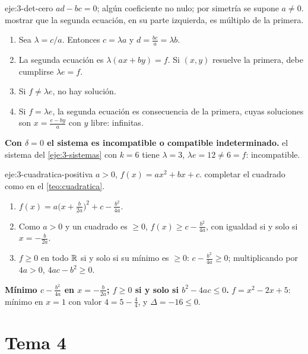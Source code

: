 \begin{solucion}{eje:3-det-cero}
\datos $ad-bc=0$; algún coeficiente no nulo; por simetría se supone $a\neq0$.
\planteamiento mostrar que la segunda ecuación, en su parte izquierda, es múltiplo de la primera.
\pasos
\begin{enumerate}[label=\arabic*.]
  \item Sea $\lambda=c/a$. Entonces $c=\lambda a$ y $d=\frac{bc}a=\lambda b$.
  \item La segunda ecuación es $\lambda(ax+by)=f$. Si $(x,y)$ resuelve la primera, debe cumplirse $\lambda e=f$.
  \item Si $f\neq\lambda e$, no hay solución.
  \item Si $f=\lambda e$, la segunda ecuación es consecuencia de la primera, cuyas soluciones son $x=\frac{e-by}a$ con $y$ libre: infinitas.
\end{enumerate}
\resultado \textbf{Con $\delta=0$ el sistema es incompatible o compatible indeterminado.}
\comprobacion el sistema del \cref{eje:3-sistemas} con $k=6$ tiene $\lambda=3$, $\lambda e=12\neq6=f$: incompatible.
\end{solucion}

\begin{solucion}{eje:3-cuadratica-positiva}
\datos $a>0$, $f(x)=ax^2+bx+c$.
\planteamiento completar el cuadrado como en el \cref{teo:cuadratica}.
\pasos
\begin{enumerate}[label=\arabic*.]
  \item $f(x)=a\bigl(x+\frac b{2a}\bigr)^2+c-\frac{b^2}{4a}$.
  \item Como $a>0$ y un cuadrado es $\ge0$, $f(x)\ge c-\frac{b^2}{4a}$, con igualdad si y solo si $x=-\frac b{2a}$.
  \item $f\ge0$ en todo $\mathbb{R}$ si y solo si su mínimo es $\ge0$: $c-\frac{b^2}{4a}\ge0$; multiplicando por $4a>0$, $4ac-b^2\ge0$.
\end{enumerate}
\resultado \textbf{Mínimo $c-\frac{b^2}{4a}$ en $x=-\frac b{2a}$; $f\ge0$ si y solo si $b^2-4ac\le0$.}
\comprobacion $f=x^2-2x+5$: mínimo en $x=1$ con valor $4=5-\frac44$, y $\Delta=-16\le0$.
\end{solucion}
\section{Tema 4}

